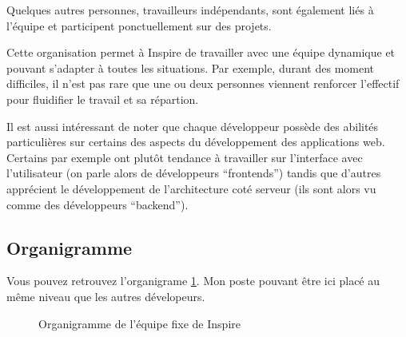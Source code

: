\documentclass[12pt,a4paper]{book}
\begin{document}
Quelques autres personnes, travailleurs indépendants, sont également liés à l'équipe et participent ponctuellement sur des projets.

Cette organisation permet à Inspire de travailler avec une équipe dynamique et pouvant s'adapter à toutes les situations. Par exemple, durant des moment difficiles, il n'est pas rare que une ou deux personnes viennent renforcer l'effectif pour fluidifier le travail et sa répartion. 

Il est aussi intéressant de noter que chaque développeur possède des abilités particulières sur certains des aspects du développement des applications web. Certains par exemple ont plutôt tendance à travailler sur l'interface avec l'utilisateur (on parle alors de développeurs ``frontends'') tandis que d'autres apprécient le développement de l'architecture coté serveur (ils sont alors vu comme des développeurs ``backend'').

\subsection{Organigramme}

Vous pouvez retrouvez l'organigrame \cref{fig:1}. Mon poste pouvant être ici placé au même niveau que les autres dévelopeurs.


\begin{figure}[h]
   \centering
{}
\caption{\label {}Organigramme de l'équipe fixe de Inspire} 
\label{fig:1}
\end{figure}
\end{document}
